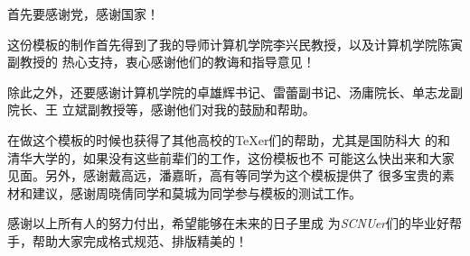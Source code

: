 

\begin{ack}

  首先要感谢党，感谢国家！
  
  这份模板的制作首先得到了我的导师计算机学院李兴民教授，以及计算机学院陈寅副教授的
  热心支持，衷心感谢他们的教诲和指导意见！

  除此之外，还要感谢计算机学院的卓雄辉书记、雷蕾副书记、汤庸院长、单志龙副院长、王
  立斌副教授等，感谢他们对我的鼓励和帮助。

  在做这个模板的时候也获得了其他高校的\TeX{}er们的帮助，尤其是国防科大
  的\nudtpaper{}和清华大学的\thuthesis{}，如果没有这些前辈们的工作，这份模板也不
  可能这么快出来和大家见面。另外，感谢戴高远，潘嘉昕，高有等同学为这个模板提供了
  很多宝贵的素材和建议，感谢周晓倩同学和莫城为同学参与模板的测试工作。

  感谢以上所有人的努力付出，希望\scnuthesis{}能够在未来的日子里成
  为\textit{SCNUer}们的毕业好帮手，帮助大家完成格式规范、排版精美的！

\end{ack}
